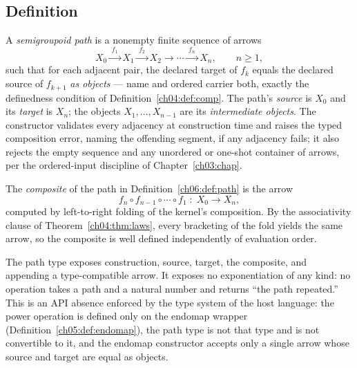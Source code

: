 \subsection{Definition}

\begin{definition}
\label{ch06:def:path}
A \emph{semigroupoid path} is a nonempty finite sequence of arrows
\[
  X_0 \xrightarrow{\;f_1\;} X_1 \xrightarrow{\;f_2\;} X_2
  \longrightarrow \cdots \xrightarrow{\;f_n\;} X_n ,
  \qquad n \ge 1,
\]
such that for each adjacent pair, the declared target of $f_k$ equals the
declared source of $f_{k+1}$ \emph{as objects} --- name and ordered carrier
both, exactly the definedness condition of
Definition~\ref{ch04:def:comp}. The path's \emph{source} is $X_0$ and its
\emph{target} is $X_n$; the objects $X_1, \dots, X_{n-1}$ are its
\emph{intermediate objects}. The constructor validates every adjacency at
construction time and raises the typed composition error, naming the
offending segment, if any adjacency fails; it also rejects the empty
sequence and any unordered or one-shot container of arrows, per the
ordered-input discipline of Chapter~\ref{ch03:chap}.
\end{definition}

\begin{definition}
\label{ch06:def:composite}
The \emph{composite} of the path in Definition~\ref{ch06:def:path} is the
arrow
\[
  f_n \circ f_{n-1} \circ \cdots \circ f_1 \;:\; X_0 \to X_n ,
\]
computed by left-to-right folding of the kernel's composition. By the
associativity clause of Theorem~\ref{ch04:thm:laws}, every bracketing of
the fold yields the same arrow, so the composite is well defined
independently of evaluation order.
\end{definition}

\begin{ruleenv}
\label{ch06:rule:nopower}
The path type exposes construction, source, target, the composite, and
appending a type-compatible arrow. It exposes no exponentiation of any
kind: no operation takes a path and a natural number and returns
``the path repeated.'' This is an API absence enforced by the type system
of the host language: the power operation is defined only on the endomap
wrapper (Definition~\ref{ch05:def:endomap}), the path type is not that
type and is not convertible to it, and the endomap constructor accepts only
a single arrow whose source and target are equal as objects.
\end{ruleenv}


